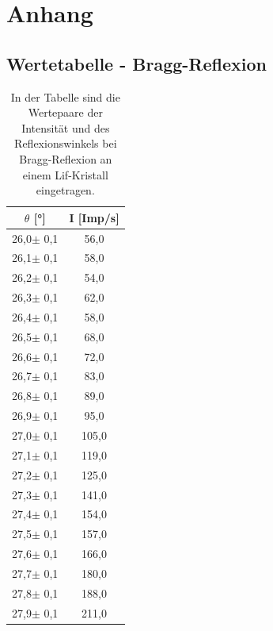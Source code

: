\documentclass[titlepage = firstcover]{scrartcl}
\begin{document}
            \newpage
            \section{Anhang}
            \FloatBarrier
            \subsection{Wertetabelle - Bragg-Reflexion}
            \begin{table}
              \centering
              \caption{In der Tabelle sind die Wertepaare der Intensität und des Reflexionswinkels bei Bragg-Reflexion an einem Lif-Kristall eingetragen.}

              \begin{tabular} {c c}
                \toprule
                {$\theta$ [°]} & {I [Imp/s]}  \\
                \midrule
                26,0$\pm$ 0,1 & 	56,0    \\
                26,1$\pm$ 0,1 & 	58,0    \\
                26,2$\pm$ 0,1 & 	54,0    \\
                26,3$\pm$ 0,1 & 	62,0    \\
                26,4$\pm$ 0,1 & 	58,0    \\
                26,5$\pm$ 0,1 & 	68,0    \\
                26,6$\pm$ 0,1 & 	72,0    \\
                26,7$\pm$ 0,1 & 	83,0    \\
                26,8$\pm$ 0,1 & 	89,0    \\
                26,9$\pm$ 0,1 & 	95,0    \\
                27,0$\pm$ 0,1 & 	105,0   \\
                27,1$\pm$ 0,1 & 	119,0   \\
                27,2$\pm$ 0,1 & 	125,0   \\
                27,3$\pm$ 0,1 & 	141,0   \\
                27,4$\pm$ 0,1 & 	154,0   \\
                27,5$\pm$ 0,1 & 	157,0   \\
                27,6$\pm$ 0,1 & 	166,0   \\
                27,7$\pm$ 0,1 & 	180,0   \\
                27,8$\pm$ 0,1 & 	188,0   \\
                27,9$\pm$ 0,1 & 	211,0   \\

\end{tabular}
\end{table}
\end{document}
